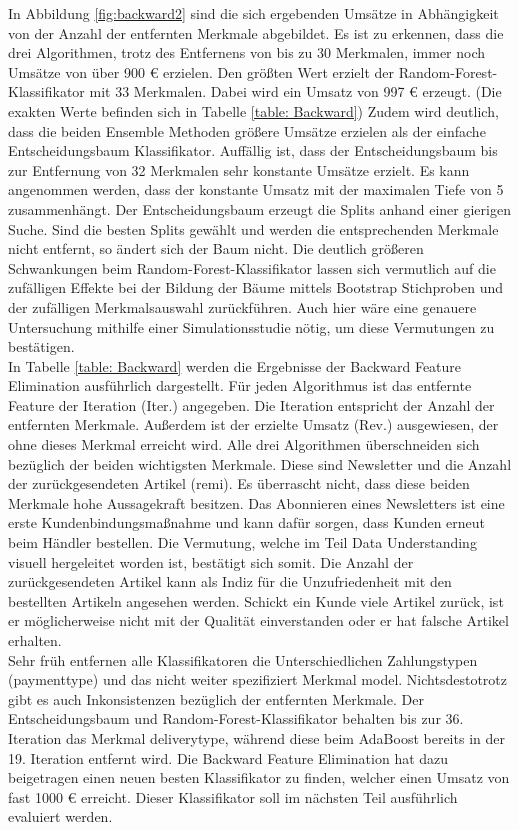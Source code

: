 In Abbildung \ref{fig:backward2} sind die sich ergebenden Umsätze in Abhängigkeit von der Anzahl der entfernten Merkmale abgebildet. Es ist zu erkennen, dass die drei Algorithmen, trotz des Entfernens von bis zu 30 Merkmalen, immer noch Umsätze von über 900 \euro{} erzielen. Den größten Wert erzielt der Random-Forest-Klassifikator mit 33 Merkmalen. Dabei wird ein Umsatz von 997 \euro{} erzeugt. (Die exakten Werte befinden sich in Tabelle \ref{table: Backward}) Zudem wird deutlich, dass die beiden Ensemble Methoden größere Umsätze erzielen als der einfache Entscheidungsbaum Klassifikator. Auffällig ist, dass der Entscheidungsbaum bis zur Entfernung von 32 Merkmalen sehr konstante Umsätze erzielt. Es kann angenommen werden, dass der konstante Umsatz mit der maximalen Tiefe von 5 zusammenhängt. Der Entscheidungsbaum erzeugt die Splits anhand einer gierigen Suche. Sind die besten Splits gewählt und werden die entsprechenden Merkmale nicht entfernt, so ändert sich der Baum nicht. Die deutlich größeren Schwankungen beim Random-Forest-Klassifikator lassen sich vermutlich auf die zufälligen Effekte bei der Bildung der Bäume mittels Bootstrap Stichproben und der zufälligen Merkmalsauswahl zurückführen. Auch hier wäre eine genauere Untersuchung mithilfe einer Simulationsstudie nötig, um diese Vermutungen zu bestätigen.\\ 

In Tabelle \ref{table: Backward} werden die Ergebnisse der Backward Feature Elimination ausführlich dargestellt. Für jeden Algorithmus ist das entfernte Feature der Iteration (Iter.) angegeben. Die Iteration entspricht der Anzahl der entfernten Merkmale. Außerdem ist der erzielte Umsatz (Rev.) ausgewiesen, der ohne dieses Merkmal erreicht wird. Alle drei Algorithmen überschneiden sich bezüglich der beiden wichtigsten Merkmale. Diese sind Newsletter und die Anzahl der zurückgesendeten Artikel (remi). Es überrascht nicht, dass diese beiden Merkmale hohe Aussagekraft besitzen. Das Abonnieren eines Newsletters ist eine erste Kundenbindungsmaßnahme und kann dafür sorgen, dass Kunden erneut beim Händler bestellen. Die Vermutung, welche im Teil Data Understanding visuell hergeleitet worden ist, bestätigt sich somit. Die Anzahl der zurückgesendeten Artikel kann als Indiz für die Unzufriedenheit mit den bestellten Artikeln angesehen werden. Schickt ein Kunde viele Artikel zurück, ist er möglicherweise nicht mit der Qualität einverstanden oder er hat falsche Artikel erhalten. \\

Sehr früh entfernen alle Klassifikatoren die Unterschiedlichen Zahlungstypen (paymenttype) und das nicht weiter spezifiziert Merkmal model. Nichtsdestotrotz gibt es auch Inkonsistenzen bezüglich der entfernten Merkmale. Der Entscheidungsbaum und Random-Forest-Klassifikator behalten bis zur 36. Iteration das Merkmal deliverytype, während diese beim AdaBoost bereits in der 19. Iteration entfernt wird. Die Backward Feature Elimination hat dazu beigetragen einen neuen besten Klassifikator zu finden, welcher einen Umsatz von fast 1000 \euro{} erreicht. Dieser Klassifikator soll im nächsten Teil ausführlich evaluiert werden.


